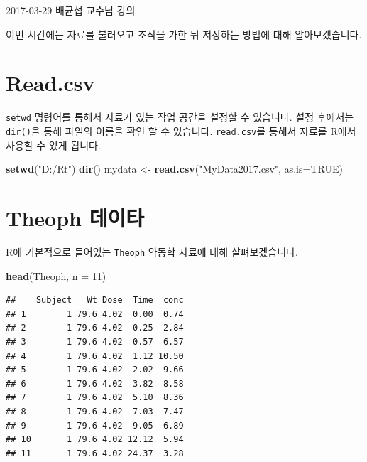 \documentclass[11pt,]{krantz}
\makeatletter
\newenvironment{Shaded}{\begin{snugshade}}{\end{snugshade}}
\newcommand{\KeywordTok}[1]{\textcolor[rgb]{0.13,0.29,0.53}{\textbf{#1}}}
\newcommand{\DataTypeTok}[1]{\textcolor[rgb]{0.13,0.29,0.53}{#1}}
\newcommand{\DecValTok}[1]{\textcolor[rgb]{0.00,0.00,0.81}{#1}}
\newcommand{\StringTok}[1]{\textcolor[rgb]{0.31,0.60,0.02}{#1}}
\newcommand{\OtherTok}[1]{\textcolor[rgb]{0.56,0.35,0.01}{#1}}
\newcommand{\NormalTok}[1]{#1}
\renewenvironment{quote}{\begin{VF}}{\end{VF}}
\newenvironment{kframe}{%
\medskip{}
\setlength{\fboxsep}{.8em}
 \def\at@end@of@kframe{}%
 \ifinner\ifhmode%
  \def\at@end@of@kframe{\end{minipage}}%
  \begin{minipage}{\columnwidth}%
 \fi\fi%
 \def\FrameCommand##1{\hskip\@totalleftmargin \hskip-\fboxsep
 \colorbox{shadecolor}{##1}\hskip-\fboxsep
     \hskip-\linewidth \hskip-\@totalleftmargin \hskip\columnwidth}%
 \MakeFramed {\advance\hsize-\width
   \@totalleftmargin\z@ \linewidth\hsize
   \@setminipage}}%
 {\par\unskip\endMakeFramed%
 \at@end@of@kframe}
\renewenvironment{Shaded}{\begin{kframe}}{\end{kframe}}
\theoremstyle{definition}
\theoremstyle{definition}
\theoremstyle{remark}
\makeatother
\begin{document}
\begin{quote}
2017-03-29 배균섭 교수님 강의
\end{quote}

이번 시간에는 자료를 불러오고 조작을 가한 뒤 저장하는 방법에 대해
알아보겠습니다.

\section{Read.csv}\label{read.csv}

\texttt{setwd} 명령어를 통해서 자료가 있는 작업 공간을 설정할 수
있습니다. 설정 후에서는 \texttt{dir()}을 통해 파일의 이름을 확인 할 수
있습니다. \texttt{read.csv}를 통해서 자료를 R에서 사용할 수 있게 됩니다.

\begin{Shaded}
\begin{Highlighting}[]
\KeywordTok{setwd}\NormalTok{(}\StringTok{"D:/Rt"}\NormalTok{)}
\KeywordTok{dir}\NormalTok{()}
\NormalTok{mydata <-}\StringTok{ }\KeywordTok{read.csv}\NormalTok{(}\StringTok{"MyData2017.csv"}\NormalTok{, }\DataTypeTok{as.is=}\OtherTok{TRUE}\NormalTok{)}
\end{Highlighting}
\end{Shaded}

\section{Theoph 데이타}\label{theoph-}

R에 기본적으로 들어있는 \texttt{Theoph} 약동학 자료에 대해
살펴보겠습니다.

\begin{Shaded}
\begin{Highlighting}[]
\KeywordTok{head}\NormalTok{(Theoph, }\DataTypeTok{n =} \DecValTok{11}\NormalTok{)}
\end{Highlighting}
\end{Shaded}

\begin{verbatim}
##    Subject   Wt Dose  Time  conc
## 1        1 79.6 4.02  0.00  0.74
## 2        1 79.6 4.02  0.25  2.84
## 3        1 79.6 4.02  0.57  6.57
## 4        1 79.6 4.02  1.12 10.50
## 5        1 79.6 4.02  2.02  9.66
## 6        1 79.6 4.02  3.82  8.58
## 7        1 79.6 4.02  5.10  8.36
## 8        1 79.6 4.02  7.03  7.47
## 9        1 79.6 4.02  9.05  6.89
## 10       1 79.6 4.02 12.12  5.94
## 11       1 79.6 4.02 24.37  3.28
\end{verbatim}
\end{document}
